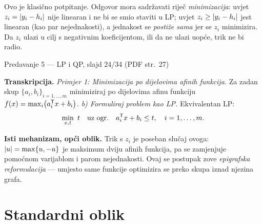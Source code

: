 \begin{zamka}[Zamka: ,,zašto smijem $\geq$ umjesto $=$``]
Ovo je klasično potpitanje. Odgovor mora sadržavati riječ \emph{minimizacija}:
uvjet $z_i = \left\lvert y_i - h_i \right\rvert$ nije linearan i ne bi se smio staviti u LP;
uvjet $z_i \geq \left\lvert y_i - h_i \right\rvert$ jest linearan (kao par nejednakosti), a
jednakost se \emph{postiže sama} jer se $z_i$ minimizira. Da $z_i$ ulazi u cilj s
negativnim koeficijentom, ili da ne ulazi uopće, trik ne bi radio.
\end{zamka}

\begin{izvor}{Predavanje 5 --- LP i QP, slajd 24/34 (PDF str.~27)}

\textbf{Transkripcija.} \emph{Primjer 1: Minimizacija po dijelovima afinih
funkcija.} Za zadan skup $\{a_i, b_i\}_{i=1,\dots,m}$ minimiziraj po dijelovima
afinu funkciju $f(x) = \max_{i} \bigl(a_i^{\mathsf{T}} x + b_i\bigr)$.
\emph{b) Formuliraj problem kao LP.} Ekvivalentan LP:
\[
\min_{x,t}\ t \quad \text{uz ogr.}\quad a_i^{\mathsf{T}} x + b_i \leq t, \quad i = 1,\dots,m .
\]

\textbf{Isti mehanizam, opći oblik.} Trik s $z_i$ je poseban slučaj ovoga:
$\left\lvert u \right\rvert = \max\{u, -u\}$ je maksimum dviju afinih funkcija, pa se zamjenjuje
pomoćnom varijablom i parom nejednakosti. Ovaj se postupak zove
\emph{epigrafska reformulacija} --- umjesto same funkcije optimizira se preko
skupa iznad njezina grafa.
\end{izvor}

\section{Standardni oblik}
\label{sec:z3-standardni}

